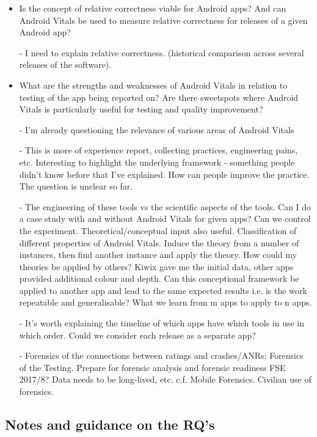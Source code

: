 \begin{itemize}
    \item Is the concept of relative correctness viable for Android apps? And can Android Vitals be used to measure relative correctness for releases of a given Android app? 
    
    - I need to explain relative correctness. (historical comparison across several releases of the software).
    
    \item What are the strengths and weaknesses of Android Vitals in relation to testing of the app being reported on? Are there sweetspots where Android Vitals is particularly useful for testing and quality improvement?
    
    - I'm already questioning the relevance of various areas of Android Vitals
    
    - This is more of experience report, collecting practices, engineering pains, etc. Interesting to highlight the underlying framework - something people didn't know before that I've explained. How can people improve the practice. The question is unclear so far.
    
    - The engineering of these tools vs the scientific aspects of the tools. Can I do a case study with and without Android Vitals for given apps? Can we control the experiment. Theoretical/conceptual input also useful. Classification of different properties of Android Vitals. Induce the theory from a number of instances, then find another instance and apply the theory. How could my theories be applied by others? Kiwix gave me the initial data, other apps provided additional colour and depth. Can this conceptional framework be applied to another app and lead to the same expected results i.e. is the work repeatable and generalisable? What we learn from m apps to apply to n apps. 
    
    - It's worth explaining the timeline of which apps have which tools in use in which order. Could we consider each release as a separate app? 
    
    - Forensics of the connections between ratings and crashes/ANRs; Forensics of the Testing. Prepare for forensic analysis and forensic readiness FSE 2017/8? Data needs to be long-lived, etc. c.f. Mobile Forensics. Civilian use of forensics. 
    
\end{itemize}

\subsection{Notes and guidance on the RQ's}

